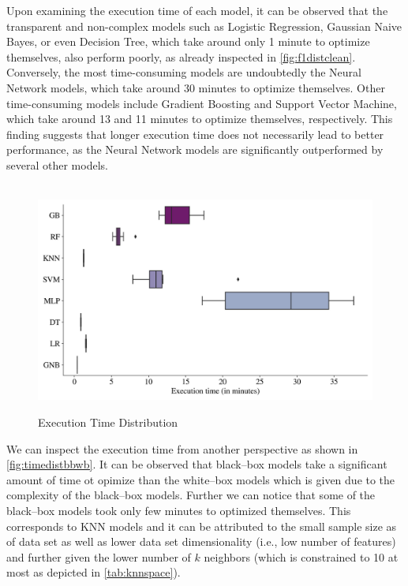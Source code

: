 Upon examining the execution time of each model, it can be observed that the transparent and non-complex models such as Logistic Regression, Gaussian Naive Bayes, or even Decision Tree, which take around only 1 minute to optimize themselves, also perform poorly, as already inspected in \autoref{fig:f1distclean}.
Conversely, the most time-consuming models are undoubtedly the Neural Network models, which take around 30 minutes to optimize themselves. Other time-consuming models include Gradient Boosting and Support Vector Machine, which take around 13 and 11 minutes to optimize themselves, respectively.
This finding suggests that longer execution time does not necessarily lead to better performance, as the Neural Network models are significantly outperformed by several other models.
\begin{figure}[H]
\centering
\caption{Execution Time Distribution}\vspace{0.5em}
\label{fig:timedist}\
\includegraphics[width=140mm]{Figures/EXECUTION_TIME_Distribution.jpg}
\centering{\begin{source}Author's results in Python\end{source}}\vspace{-1em}
\end{figure}
We can inspect the execution time from another perspective as shown in \autoref{fig:timedistbbwb}.
It can be observed that black--box models take a significant amount of time ot opimize than the white--box models which is given due to the complexity of the black--box models.
Further we can notice that some of the black--box models took only few minutes to optimized themselves. This corresponds to KNN models and it can be attributed to the small sample size as of data set as well as lower data set dimensionality (i.e., low number of features) and further given the lower number of $k$ neighbors (which is constrained to 10 at most as depicted in \autoref{tab:knnspace}).
